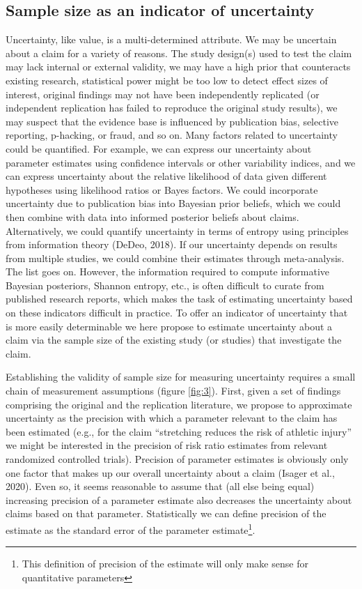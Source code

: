 \documentclass[
  english,
  jou,floatsintext]{apa6}
\begin{document}
\hypertarget{sample-size-as-an-indicator-of-uncertainty}{%
\subsection{Sample size as an indicator of uncertainty}\label{sample-size-as-an-indicator-of-uncertainty}}

Uncertainty, like value, is a multi-determined attribute. We may be uncertain about a claim for a variety of reasons. The study design(s) used to test the claim may lack internal or external validity, we may have a high prior that counteracts existing research, statistical power might be too low to detect effect sizes of interest, original findings may not have been independently replicated (or independent replication has failed to reproduce the original study results), we may suspect that the evidence base is influenced by publication bias, selective reporting, p-hacking, or fraud, and so on. Many factors related to uncertainty could be quantified. For example, we can express our uncertainty about parameter estimates using confidence intervals or other variability indices, and we can express uncertainty about the relative likelihood of data given different hypotheses using likelihood ratios or Bayes factors. We could incorporate uncertainty due to publication bias into Bayesian prior beliefs, which we could then combine with data into informed posterior beliefs about claims. Alternatively, we could quantify uncertainty in terms of entropy using principles from information theory (DeDeo, 2018). If our uncertainty depends on results from multiple studies, we could combine their estimates through meta-analysis. The list goes on. However, the information required to compute informative Bayesian posteriors, Shannon entropy, etc., is often difficult to curate from published research reports, which makes the task of estimating uncertainty based on these indicators difficult in practice. To offer an indicator of uncertainty that is more easily determinable we here propose to estimate uncertainty about a claim via the sample size of the existing study (or studies) that investigate the claim.

Establishing the validity of sample size for measuring uncertainty requires a small chain of measurement assumptions (figure \ref{fig:3}). First, given a set of findings comprising the original and the replication literature, we propose to approximate uncertainty as the precision with which a parameter relevant to the claim has been estimated (e.g., for the claim ``stretching reduces the risk of athletic injury'' we might be interested in the precision of risk ratio estimates from relevant randomized controlled trials). Precision of parameter estimates is obviously only one factor that makes up our overall uncertainty about a claim (Isager et al., 2020). Even so, it seems reasonable to assume that (all else being equal) increasing precision of a parameter estimate also decreases the uncertainty about claims based on that parameter. Statistically we can define precision of the estimate as the standard error of the parameter estimate\footnote{This definition of precision of the estimate will only make sense for quantitative parameters}.
\end{document}
